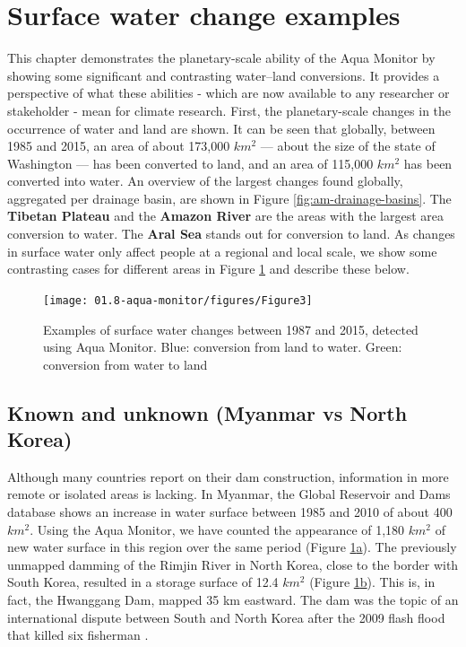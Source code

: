 \section{Surface water change examples}

This chapter demonstrates the planetary-scale ability of the Aqua Monitor by showing some significant and contrasting water–land conversions. It provides a perspective of what these abilities - which are now available to any researcher or stakeholder - mean for climate research. First, the planetary-scale changes in the occurrence of water and land are shown. It can be seen that globally, between 1985 and 2015, an area of about 173,000 $km^2$ — about the size of the state of Washington — has been converted to land, and an area of 115,000 $km^2$ has been converted into water. An overview of the largest changes found globally, aggregated per drainage basin, are shown in Figure \ref{fig:am-drainage-basins}. The \textbf{Tibetan Plateau} and the \textbf{Amazon River} are the areas with the largest area conversion to water. The \textbf{Aral Sea} stands out for conversion to land. As changes in surface water only affect people at a regional and local scale, we show some contrasting cases for different areas in Figure \ref{fig:am-examples} and describe these below.

\begin{figure}[H]
	\centering
	\texttt{[image: 01.8-aqua-monitor/figures/Figure3]}
	\caption{Examples of surface water changes between 1987 and 2015, detected using Aqua Monitor. Blue: conversion from land to water. Green: conversion from water to land}
	\label{fig:am-examples}
\end{figure}

\subsection{Known and unknown (Myanmar vs North Korea)}
Although many countries report on their dam construction, information in more remote or isolated areas is lacking. In Myanmar, the Global Reservoir and Dams database \citet{Lehner2011} shows an increase in water surface between 1985 and 2010 of about 400 $km^2$. Using the Aqua Monitor, we have counted the appearance of 1,180 $km^2$ of new water surface in this region over the same period (Figure \hyperref[fig:am-examples]{\ref{fig:am-examples}a}). The previously unmapped damming of the Rimjin River in North Korea, close to the border with South Korea, resulted in a storage surface of 12.4 $km^2$ (Figure \hyperref[fig:am-examples]{\ref{fig:am-examples}b}). This is, in fact, the Hwanggang Dam, mapped 35 km eastward. The dam was the topic of an international dispute between South and North Korea after the 2009 flash flood that killed six fisherman \citet{SangHun2009}.

